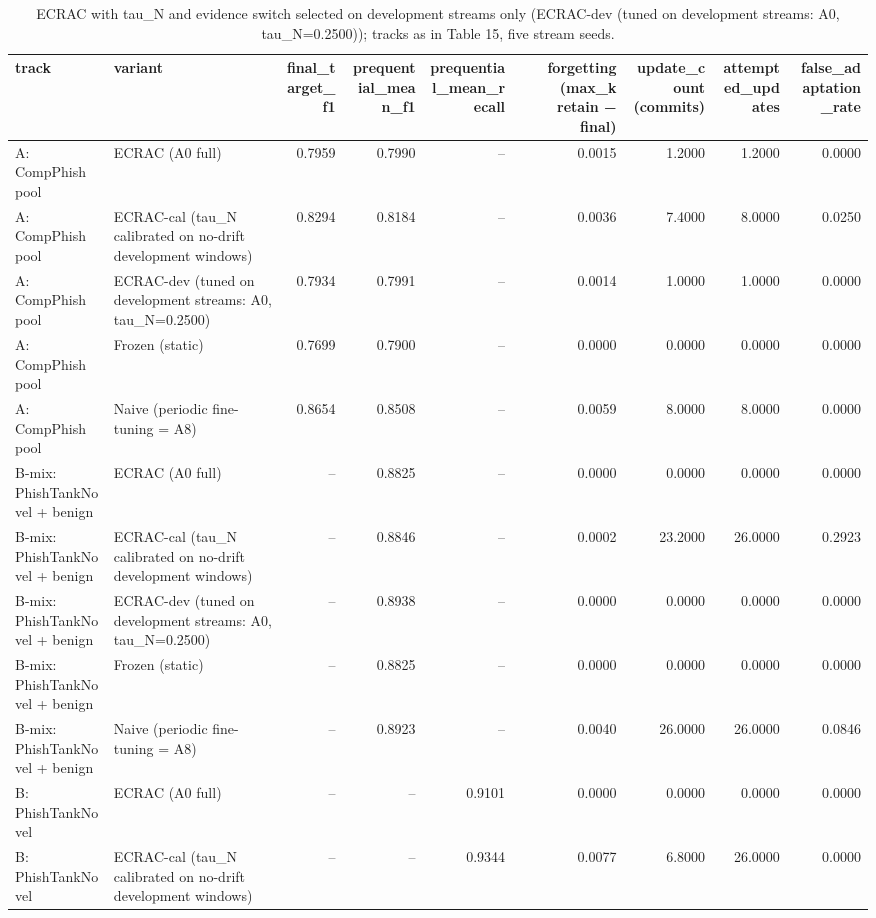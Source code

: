 \begin{table}[t]
\centering
\scriptsize
\caption{ECRAC with tau\_N and evidence switch selected on development streams only (ECRAC-dev (tuned on development streams: A0, tau\_N=0.2500)); tracks as in Table 15, five stream seeds.}
\label{tab:rev_R20_ecrac_retuned_on_development_streams}
\begin{tabular}{llrrrrrrr}
\toprule
track & variant & final\_target\_f1 & prequential\_mean\_f1 & prequential\_mean\_recall & forgetting (max\_k retain − final) & update\_count (commits) & attempted\_updates & false\_adaptation\_rate \\
\midrule
A: CompPhish pool & ECRAC (A0 full) & 0.7959 & 0.7990 & -- & 0.0015 & 1.2000 & 1.2000 & 0.0000 \\
A: CompPhish pool & ECRAC-cal (tau\_N calibrated on no-drift development windows) & 0.8294 & 0.8184 & -- & 0.0036 & 7.4000 & 8.0000 & 0.0250 \\
A: CompPhish pool & ECRAC-dev (tuned on development streams: A0, tau\_N=0.2500) & 0.7934 & 0.7991 & -- & 0.0014 & 1.0000 & 1.0000 & 0.0000 \\
A: CompPhish pool & Frozen (static) & 0.7699 & 0.7900 & -- & 0.0000 & 0.0000 & 0.0000 & 0.0000 \\
A: CompPhish pool & Naive (periodic fine-tuning = A8) & 0.8654 & 0.8508 & -- & 0.0059 & 8.0000 & 8.0000 & 0.0000 \\
B-mix: PhishTankNovel + benign & ECRAC (A0 full) & -- & 0.8825 & -- & 0.0000 & 0.0000 & 0.0000 & 0.0000 \\
B-mix: PhishTankNovel + benign & ECRAC-cal (tau\_N calibrated on no-drift development windows) & -- & 0.8846 & -- & 0.0002 & 23.2000 & 26.0000 & 0.2923 \\
B-mix: PhishTankNovel + benign & ECRAC-dev (tuned on development streams: A0, tau\_N=0.2500) & -- & 0.8938 & -- & 0.0000 & 0.0000 & 0.0000 & 0.0000 \\
B-mix: PhishTankNovel + benign & Frozen (static) & -- & 0.8825 & -- & 0.0000 & 0.0000 & 0.0000 & 0.0000 \\
B-mix: PhishTankNovel + benign & Naive (periodic fine-tuning = A8) & -- & 0.8923 & -- & 0.0040 & 26.0000 & 26.0000 & 0.0846 \\
B: PhishTankNovel & ECRAC (A0 full) & -- & -- & 0.9101 & 0.0000 & 0.0000 & 0.0000 & 0.0000 \\
B: PhishTankNovel & ECRAC-cal (tau\_N calibrated on no-drift development windows) & -- & -- & 0.9344 & 0.0077 & 6.8000 & 26.0000 & 0.0000 \\

\end{tabular}
\end{table}
